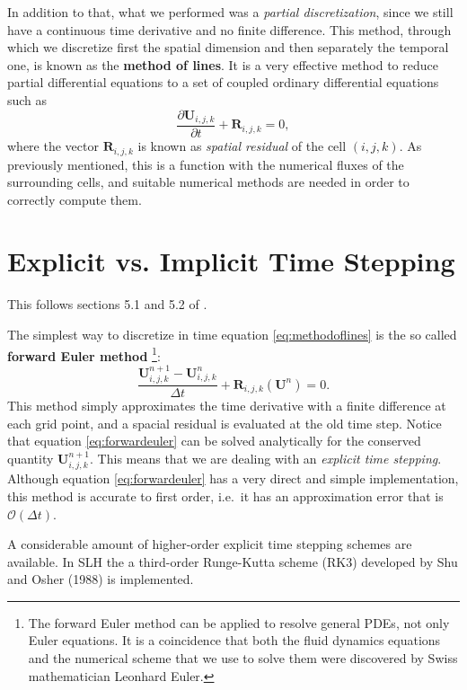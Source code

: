In addition to that, what we performed was a \textit{partial discretization}, since we still have a continuous time derivative and no finite difference. This method, through which we discretize first the spatial dimension and then separately the temporal one, is known as the \textbf{method of lines}. It is a very effective method to reduce partial differential equations to a set of coupled ordinary differential equations such as
\begin{equation}\label{eq:methodoflines}
	\frac{\partial \mathbf{U}_{i, j, k}}{\partial t} + \mathbf{R}_{i, j, k}=0,
\end{equation}
where the vector $\mathbf{R}_{i, j, k}$ is known as \textit{spatial residual} of the cell $(i, j, k)$. As previously mentioned, this is a function with the numerical fluxes of the surrounding cells, and suitable numerical methods are needed in order to correctly compute them.
\section{Explicit vs. Implicit Time Stepping}
This follows sections 5.1 and 5.2 of \citet{miczek}.

The simplest way to discretize in time equation \ref{eq:methodoflines} is the so called \textbf{forward Euler method} \footnote{The forward Euler method can be applied to resolve general PDEs, not only Euler equations. It is a coincidence that both the fluid dynamics equations and the numerical scheme that we use to solve them were discovered by Swiss mathematician Leonhard Euler.}:
\begin{equation}\label{eq:forwardeuler}
	\frac{\mathbf{U}^{n+1}_{i, j, k} - \mathbf{U}^{n}_{i, j, k}}{\Delta t} + \mathbf{R}_{i, j, k}(\mathbf{U}^n)=0.
\end{equation}
This method simply approximates the time derivative with a finite difference at each grid point, and a spacial residual is evaluated at the old time step. Notice that equation \ref{eq:forwardeuler} can be solved analytically for the conserved quantity $\mathbf{U}^{n+1}_{i, j, k}$. This means that we are dealing with an \textit{explicit time stepping}. Although equation \ref{eq:forwardeuler} has a very direct and simple implementation, this method is accurate to first order, i.e.\ it has an approximation error that is $\mathcal{O}(\Delta t)$.

A considerable amount of higher-order explicit time stepping schemes are available. In SLH the a third-order Runge-Kutta scheme (RK3) developed by Shu and Osher (1988) is implemented. 

